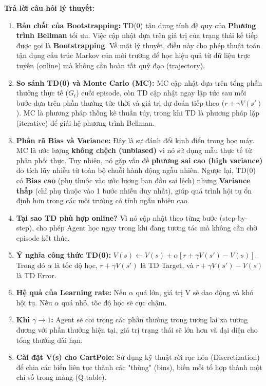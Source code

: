 \textbf{Trả lời câu hỏi lý thuyết:}
\begin{enumerate}
    \item \textbf{Bản chất của Bootstrapping:} TD(0) tận dụng tính đệ quy của \textbf{Phương trình Bellman} tối ưu. Việc cập nhật dựa trên giá trị của trạng thái kế tiếp được gọi là \textbf{Bootstrapping}. Về mặt lý thuyết, điều này cho phép thuật toán tận dụng cấu trúc Markov của môi trường để học hiệu quả từ dữ liệu trực tuyến (online) mà không cần hoàn tất quỹ đạo (trajectory).
    \item \textbf{So sánh TD(0) và Monte Carlo (MC):} MC cập nhật dựa trên tổng phần thưởng thực tế ($G_t$) cuối episode, còn TD cập nhật ngay lập tức sau mỗi bước dựa trên phần thưởng tức thời và giá trị dự đoán tiếp theo ($r + \gamma V(s')$). MC là phương pháp thống kê thuần túy, trong khi TD là phương pháp lặp (iterative) để giải hệ phương trình Bellman.
    \item \textbf{Phân rã Bias và Variance:} Đây là sự đánh đổi kinh điển trong học máy. MC là ước lượng \textbf{không chệch (unbiased)} vì nó sử dụng mẫu thực tế từ phân phối thực. Tuy nhiên, nó gặp vấn đề \textbf{phương sai cao (high variance)} do tích lũy nhiễu từ toàn bộ chuỗi hành động ngẫu nhiên. Ngược lại, TD(0) có \textbf{Bias cao} (phụ thuộc vào ước lượng ban đầu sai lệch) nhưng \textbf{Variance thấp} (chỉ phụ thuộc vào 1 bước nhiễu duy nhất), giúp quá trình hội tụ ổn định hơn trong các môi trường có tính ngẫu nhiên cao.
    \item \textbf{Tại sao TD phù hợp online?} Vì nó cập nhật theo từng bước (step-by-step), cho phép Agent học ngay trong khi đang tương tác mà không cần chờ episode kết thúc.
    \item \textbf{Ý nghĩa công thức TD(0):} $V(s) \leftarrow V(s) + \alpha [r + \gamma V(s') - V(s)]$. Trong đó $\alpha$ là tốc độ học, $r + \gamma V(s')$ là TD Target, và $r + \gamma V(s') - V(s)$ là TD Error.
    \item \textbf{Hệ quả của Learning rate:} Nếu $\alpha$ quá lớn, giá trị V sẽ dao động và khó hội tụ. Nếu $\alpha$ quá nhỏ, tốc độ học sẽ cực chậm.
    \item \textbf{Khi $\gamma \to 1$:} Agent sẽ coi trọng các phần thưởng trong tương lai xa tương đương với phần thưởng hiện tại, giá trị trạng thái sẽ lớn hơn và đại diện cho tổng thưởng dài hạn.
    \item \textbf{Cài đặt V(s) cho CartPole:} Sử dụng kỹ thuật rời rạc hóa (Discretization) để chia các biến liên tục thành các "thùng" (bins), biến mỗi tổ hợp thành một chỉ số trong mảng (Q-table).

\end{enumerate}
